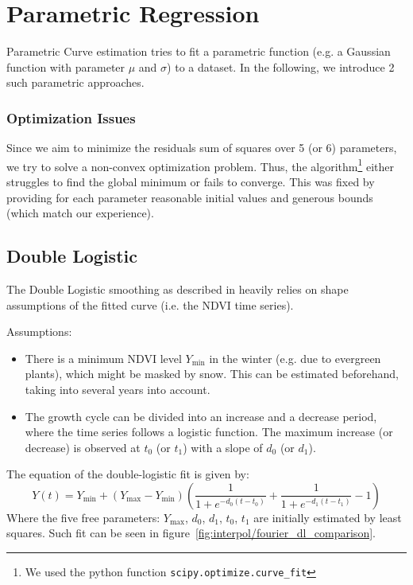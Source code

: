 \section{Parametric Regression}
Parametric Curve estimation tries to fit a parametric function (e.g. a Gaussian function with parameter $\mu$ and $\sigma$) to a dataset. In the following, we introduce 2 such parametric approaches.

\subsubsection*{Optimization Issues}
Since we aim to minimize the residuals sum of squares over 5 (or 6) parameters, we try to solve a non-convex optimization problem. Thus, the algorithm\footnote{We used the python function \texttt{scipy.optimize.curve\_fit}} either struggles to find the global minimum or fails to converge. This was fixed by providing for each parameter reasonable initial values and generous bounds (which match our experience).

\subsection{Double Logistic}
\label{sec:double_logistic}
The Double Logistic smoothing as described in \cite{beckImprovedMonitoringVegetation2006} heavily relies on shape assumptions of the fitted curve (i.e. the NDVI time series).

Assumptions:
\begin{itemize}
	\item There is a minimum NDVI level $Y_{\min}$ in the winter (e.g. due to evergreen plants), which might be masked by snow. This can be estimated beforehand, taking into several years into account.
	\item The growth cycle can be divided into an increase and a decrease period, where the time series follows a logistic function. The maximum increase (or decrease) is observed at $t_0$ (or $t_1$) with a slope of $d_0$ (or $d_1$).
\end{itemize}

The equation of the double-logistic fit is given by:
\begin{equation*}
	Y(t) = Y_{\min} + \left(Y_{\max}-Y_{\min}\right)\left(\frac{1}{1+e^{-d_0(t-t_0)}}+\frac{1}{1+e^{-d_1(t-t_1)}}-1\right)
\end{equation*}
Where the five free parameters: $Y_{\max}$, $d_0$, $d_1$, $t_0$, $t_1$ are initially estimated by least squares. Such fit can be seen in figure~\ref{fig:interpol/fourier_dl_comparison}.

